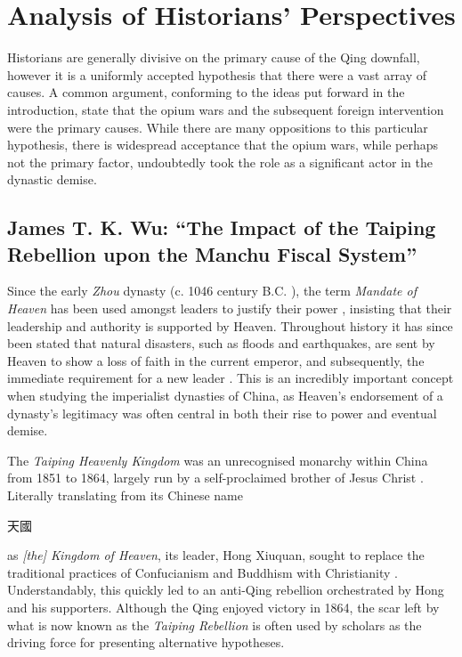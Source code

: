 \documentclass{article}
\newcommand{\zht}[1]{\begin{CJK}{UTF8}{bsmi}\normalfont #1\end{CJK}}
\begin{document}
\section{Analysis of Historians' Perspectives}

Historians are generally divisive on the primary cause of the Qing downfall, however it is a uniformly accepted hypothesis that there were a vast array of causes. A common argument, conforming to the ideas put forward in the introduction, state that the opium wars and the subsequent foreign intervention were the primary causes. While there are many oppositions to this particular hypothesis, there is widespread acceptance that the opium wars, while perhaps not the primary factor, undoubtedly took the role as a significant actor in the dynastic demise.

\subsection{James T. K. Wu: ``The Impact of the Taiping Rebellion upon the Manchu Fiscal System''}

Since the early \textit{Zhou} dynasty (c. 1046 century B.C.
\autocite{Loewe:1999}), the term \textit{Mandate of Heaven} has been used amongst leaders to justify their power
\autocite{Zhao:2009}, insisting that their leadership and authority is supported by Heaven. Throughout history it has since been stated that natural disasters, such as floods and earthquakes, are sent by Heaven to show a loss of faith in the current emperor, and subsequently, the immediate requirement for a new leader
\autocite{Elvin:1998}. This is an incredibly important concept when studying the imperialist dynasties of China, as Heaven's endorsement of a dynasty's legitimacy was often central in both their rise to power and eventual demise.

The \textit{Taiping Heavenly Kingdom} was an unrecognised monarchy within China from 1851 to 1864, largely run by a self-proclaimed brother of Jesus Christ
\autocites{Reilly:2014}{Yap:1954}. Literally translating from its Chinese name \zht{天國} as \textit{[the] Kingdom of Heaven}, its leader, Hong Xiuquan, sought to replace the traditional practices of Confucianism and Buddhism with Christianity
\autocite{Spence:1996}. Understandably, this quickly led to an anti-Qing rebellion orchestrated by Hong and his supporters. Although the Qing enjoyed victory in 1864, the scar left by what is now known as the \textit{Taiping Rebellion} is often used by scholars as the driving force for presenting alternative hypotheses.




\pagebreak
\printbibliography[title={Cited Works}, heading=bibintoc]
\end{document}
